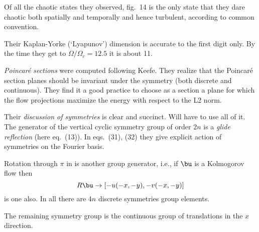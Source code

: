 \begin{description}
{Of all the chaotic states they observed, fig.~14 is the only state that
they dare
chaotic both spatially and temporally and hence
turbulent, according to common convention.



Their Kaplan-Yorke (`Lyapunov') dimension is accurate to the first digit only.
By the time they get to $\Omega/\Omega_c=12.5$ it is about 11.

\emph{Poincar\'e sections} were computed following Keefe. They
realize that the Poincar\'e section planes should be invariant under the
symmetry (both discrete and continuous). They find it a good practice to
choose as a section a plane for which the flow projections maximize the
energy with respect to the L2 norm.

Their \emph{discussion of symmetries} is clear and succinct. Will have
to use all of it.
The generator
of the vertical cyclic symmetry group of order $2n$ is a \emph{glide reflection}
(here eq.~(13)). In eqs.~(31), (32)
they give explicit action of symmetries on the Fourier basis.

Rotation through $\pi$ in is another group
generator, i.e., if $\bu$ is a Kolmogorov flow then
\[
R \bu \to [-u(-x,-y),-v(-x,-y)]
\]
is one also. In all there are $4n$ discrete symmetries group elements.

The remaining symmetry group is the continuous group of translations
in the $x$ direction.

    }

\end{description}
